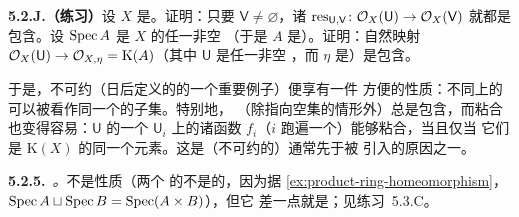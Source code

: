 \textbf{5.2.J.（练习）}\quad 设 $X$ 是\trIntegral{}\trScheme。证明：只要 $\mathsf{V}\neq\varnothing$，诸%
\trRestrictionMap{} $\operatorname{res}_{\mathsf{U},\mathsf{V}}\colon\mathcal{O}_X(\mathsf{U})
\to\mathcal{O}_X(\mathsf{V})$ 就都是包含。设 $\operatorname{Spec} A$ 是 $X$ 的任一非空\trAffine\trOpenSubset%
（于是 $A$ 是\trIntegralDomain）。证明：自然映射
$\mathcal{O}_X(\mathsf{U})\to\mathcal{O}_{X,\eta}=\mathrm{K}(A)$（其中 $\mathsf{U}$ 是任一非空%
\trOpenSubset，而 $\eta$ 是\trGenericPoint）是包含。

于是，不可约\trVariety（日后定义的\trIntegral{}\trScheme{}的一个重要例子）便享有一件
方便的性质：不同\trOpenSet{}上的\trSection{}可以被看作同一个\trRing{}的子集。特别地，
\trRestrictionMap（除指向空集的情形外）总是包含，而粘合也变得容易：$\mathsf{U}$ 的一个%
\trCover{} $\mathsf{U}_i$ 上的诸函数 $f_i$（$i$ 跑遍一个\trIndexSet）能够粘合，当且仅当
它们是 $\mathrm{K}(X)$ 的同一个元素。这是（不可约的）\trVariety{}通常先于\trScheme{}被
引入的原因之一。

\textbf{5.2.5.}\ \emph{\trhCaveat{}。}\quad \trIntegrality{}不是\trStalkLocal{}性质（两个%
\trIntegral{}\trScheme{}的\trDisjointUnion{}不是\trIntegral{}的，因为据%
\cref{ex:product-ring-homeomorphism}，$\operatorname{Spec} A\sqcup\operatorname{Spec} B=\operatorname{Spec}(A\times B)$），但它
差一点就是；见练习~5.3.C。
